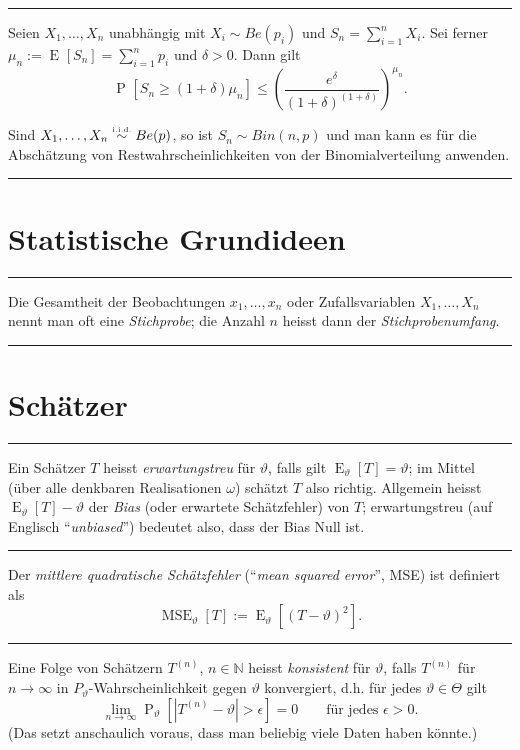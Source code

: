 \documentclass[a4paper, 12pt]{extarticle}
\newcommand{\sep}{\vspace{5pt}\noindent\hrule\vspace{5pt}}
\newcommand{\N}{\mathbb{N}}
\newcommand{\abs}[1]{\left\lvert #1 \right\rvert}
\newcommand{\Prob}[2][]{\operatorname{P}_{#1}\left[ #2 \right]}
\newcommand{\Exp}[2][]{\operatorname{E}_{#1}\left[ #2 \right]}
\newcommand{\MSE}[2][]{\operatorname{MSE}_{#1}\left[ #2 \right]}
\newcommand{\riid}{\stackrel{\text{\tiny i.i.d.}}{\sim}}
\begin{document}
\begin{multicols*}{2}
\sep

\Thm Seien $X_1,\ldots,X_n$ unabhängig mit $X_i\sim Be(p_i)$ und
$S_n=\sum_{i=1}^n X_i$. Sei ferner $\mu_n:=\Exp{S_n}=\sum_{i=1}^n p_i$ und
$\delta > 0$. Dann gilt
\[
\Prob{S_n\geq (1+\delta)\mu_n} \leq
\left(\frac{e^\delta}{(1+\delta)^{(1+\delta)}}\right)^{\mu_n}.
\]

\Com Sind $X_1,\ldots,X_n\riid Be(p)$, so ist $S_n\sim Bin(n,p)$ und man kann es
für die Abschätzung von Restwahrscheinlichkeiten von der Binomialverteilung
anwenden.

\sep

\section{Statistische Grundideen}

\sep

 Die Gesamtheit der Beobachtungen
$x_1,\ldots,x_n$ oder Zufallsvariablen $X_1,\ldots,X_n$ nennt man oft eine
\emph{Stichprobe}; die Anzahl $n$ heisst dann der \emph{Stichprobenumfang}.

\sep

\section{Schätzer}

\sep

\Def[Erwartungstreu] Ein Schätzer $T$ heisst \emph{erwartungstreu} für
$\vartheta$, falls gilt $\Exp[\vartheta]{T}=\vartheta$; im Mittel (über alle
denkbaren Realisationen $\omega$) schätzt $T$ also richtig. Allgemein heisst
$\Exp[\vartheta]{T}-\vartheta$ der \emph{Bias} (oder erwartete Schätzfehler) von
$T$; erwartungstreu (auf Englisch ``\emph{unbiased}'') bedeutet also, dass der
Bias Null ist.

\sep

 Der \emph{mittlere quadratische Schätzfehler}
(``\emph{mean squared error}'', MSE) ist definiert als
\[
\MSE[\vartheta]{T}:=\Exp[\vartheta]{(T-\vartheta)^2}.
\]

\sep

\Def[Konsistent] Eine Folge von Schätzern $T^{(n)}$, $n\in\N$ heisst
\emph{konsistent} für $\vartheta$, falls $T^{(n)}$ für $n\to\infty$ in
$P_\vartheta$-Wahrscheinlichkeit gegen $\vartheta$ konvergiert, d.h. für jedes
$\vartheta\in\Theta$ gilt
\[
\lim_{n\to\infty} \Prob[\vartheta]{\abs{T^{(n)}-\vartheta}>\epsilon} = 0
\qquad
\text{für jedes }\epsilon>0.
\]
(Das setzt anschaulich voraus, dass man beliebig viele Daten haben könnte.)


\end{multicols*}
\end{document}
